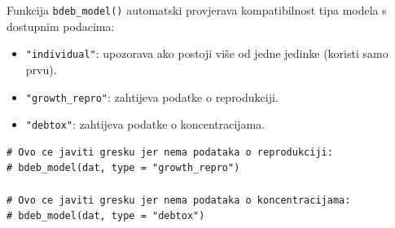\documentclass[11pt,a4paper]{article}
\newcommand{\fn}[1]{\texttt{#1()}}
\newcommand{\code}[1]{\texttt{#1}}
\begin{document}
Funkcija \fn{bdeb\_model} automatski provjerava kompatibilnost tipa
modela s dostupnim podacima:
\begin{itemize}[nosep]
  \item \code{"individual"}: upozorava ako postoji više od jedne jedinke
    (koristi samo prvu).
  \item \code{"growth\_repro"}: zahtijeva podatke o reprodukciji.
  \item \code{"debtox"}: zahtijeva podatke o koncentracijama.
\end{itemize}

\begin{lstlisting}
# Ovo ce javiti gresku jer nema podataka o reprodukciji:
# bdeb_model(dat, type = "growth_repro")

# Ovo ce javiti gresku jer nema podataka o koncentracijama:
# bdeb_model(dat, type = "debtox")
\end{lstlisting}
\end{document}
